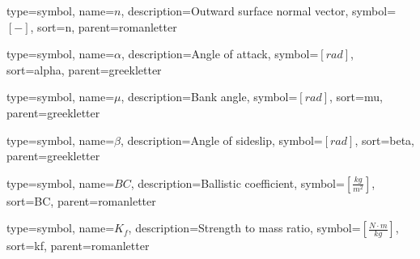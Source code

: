 {
	type=symbol, %
	name={\ensuremath{n}}, %
	description={Outward surface normal vector}, %
	symbol={$\left[- \right]$}, %
	sort=n, %
	parent=romanletter %
}

{
	type=symbol, %
	name={\ensuremath{\alpha}}, %
	description={Angle of attack}, %
	symbol={$\left[rad \right]$}, %
	sort=alpha, %
	parent=greekletter %
}

{
	type=symbol, %
	name={\ensuremath{\mu}}, %
	description={Bank angle}, %
	symbol={$\left[rad \right]$}, %
	sort=mu, %
	parent=greekletter %
}

{
	type=symbol, %
	name={\ensuremath{\beta}}, %
	description={Angle of sideslip}, %
	symbol={$\left[rad \right]$}, %
	sort=beta, %
	parent=greekletter %
}

{
type=symbol, %
name={\ensuremath{BC}}, %
description={Ballistic coefficient}, %
symbol={$\left[\frac{kg}{m^2} \right]$}, %
sort=BC, %
parent=romanletter %
}

{
type=symbol, %
name={\ensuremath{K_f}}, %
description={Strength to mass ratio}, %
symbol={$\left[\frac{N \cdot m}{kg} \right]$}, %
sort=kf, %
parent=romanletter %
}

